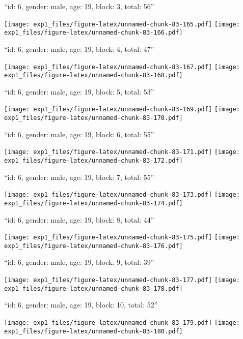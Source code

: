 \documentclass[11pt,,]{article}
\begin{document}
\newpage
[1] 

``id: 6, gender: male, age: 19, block: 3, total: 56''

\texttt{[image: exp1\_files/figure-latex/unnamed-chunk-83-165.pdf]}
\texttt{[image: exp1\_files/figure-latex/unnamed-chunk-83-166.pdf]}

\newpage
[1] 

``id: 6, gender: male, age: 19, block: 4, total: 47''

\texttt{[image: exp1\_files/figure-latex/unnamed-chunk-83-167.pdf]}
\texttt{[image: exp1\_files/figure-latex/unnamed-chunk-83-168.pdf]}

\newpage
[1] 

``id: 6, gender: male, age: 19, block: 5, total: 53''

\texttt{[image: exp1\_files/figure-latex/unnamed-chunk-83-169.pdf]}
\texttt{[image: exp1\_files/figure-latex/unnamed-chunk-83-170.pdf]}

\newpage
[1] 

``id: 6, gender: male, age: 19, block: 6, total: 55''

\texttt{[image: exp1\_files/figure-latex/unnamed-chunk-83-171.pdf]}
\texttt{[image: exp1\_files/figure-latex/unnamed-chunk-83-172.pdf]}

\newpage
[1] 

``id: 6, gender: male, age: 19, block: 7, total: 55''

\texttt{[image: exp1\_files/figure-latex/unnamed-chunk-83-173.pdf]}
\texttt{[image: exp1\_files/figure-latex/unnamed-chunk-83-174.pdf]}

\newpage
[1] 

``id: 6, gender: male, age: 19, block: 8, total: 44''

\texttt{[image: exp1\_files/figure-latex/unnamed-chunk-83-175.pdf]}
\texttt{[image: exp1\_files/figure-latex/unnamed-chunk-83-176.pdf]}

\newpage
[1] 

``id: 6, gender: male, age: 19, block: 9, total: 39''

\texttt{[image: exp1\_files/figure-latex/unnamed-chunk-83-177.pdf]}
\texttt{[image: exp1\_files/figure-latex/unnamed-chunk-83-178.pdf]}

\newpage
[1] 

``id: 6, gender: male, age: 19, block: 10, total: 52''

\texttt{[image: exp1\_files/figure-latex/unnamed-chunk-83-179.pdf]}
\texttt{[image: exp1\_files/figure-latex/unnamed-chunk-83-180.pdf]}
\end{document}
